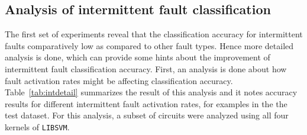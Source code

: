\subsection{Analysis of intermittent fault classification}
\label{sec:wp:intanalysis}
The first set of experiments reveal that the classification accuracy for intermittent faults comparatively low as compared to other fault types. Hence more detailed analysis is done, which can provide some hints about the improvement of intermittent fault classification accuracy. First, an analysis is done about how fault activation rates might be affecting classification accuracy. Table~\ref{tab:intdetail} summarizes the result of this analysis and it notes accuracy results for different intermittent fault activation rates, for examples in the the test dataset. For this analysis, a subset of circuits were analyzed using all four kernels of \texttt{LIBSVM}.

